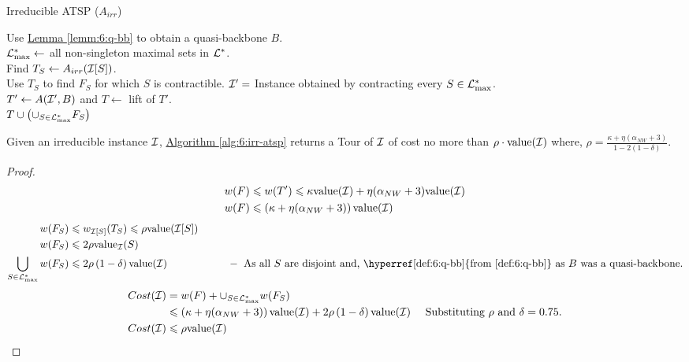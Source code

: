 \documentclass[./main.tex]{subfiles}
\begin{document}
	\begin{algorithm}\label{alg:6:irr-atsp}
		\caption{Irreducible ATSP ($A_{irr}$)}
		Use \hyperref[lemm:6:q-bb]{Lemma \ref{lemm:6:q-bb}} to obtain a quasi-backbone $B$.\\
		$\mathcal{L}^*_{\max} \leftarrow $ all non-singleton maximal sets in $\mathcal{L}^*$.\\
		 {
			Find $T_S \leftarrow A_{irr}(\mathcal{I}[S])$.\\
			Use $T_S$ to find $F_S$ for which $S$ is contractible. 
		}
		$\mathcal{I}' = $ Instance obtained by contracting every $S \in \mathcal{L}^*_{\max}$.\\
		$T' \leftarrow A(\mathcal{I}', B)$ and $T \leftarrow $ lift of $T'$.\\
		\Return $T \cup \left(\cup_{S \in \mathcal{L}^*_{\max}} F_S\right)$
	\end{algorithm}
	
	\begin{theorem}
		Given an irreducible instance $\mathcal{I}$, \hyperref[alg:6:irr-atsp]{Algorithm \ref{alg:6:irr-atsp}} returns a Tour of $\mathcal{I}$ of cost no more than $\rho\cdot\textup{value}(\mathcal{I})$ where, $\rho = \frac{\kappa + \eta(\alpha_{NW} + 3)}{1 - 2(1 - \delta)}$.
	\end{theorem}
	\begin{proof}
		\begin{align*}
			w(F) &\leqslant w(T') \leqslant \kappa\textup{value}(\mathcal{I}) + \eta(\alpha_{NW} + 3)\textup{value}(\mathcal{I}) \\
			w(F) &\leqslant \left(\kappa + \eta(\alpha_{NW} + 3)\right)\textup{value}(\mathcal{I})
		\end{align*}
		\begin{align*}
			w(F_S) &\leqslant w_{\calI[S]}(T_S) \leqslant \rho \val(\calI[S])\\
			w(F_S)&\leqslant 2\rho\val_{\calI}(S)\\
			\bigcup_{S \in \lam^*_{\max}} w(F_S) &\leqslant 2\rho \left(1 - \delta\right) \val(\calI)  \hspace*{2cm} -  \text{ As all $S$ are disjoint and, \hyperref[def:6:q-bb]{from \ref{def:6:q-bb}} as $B$ was a quasi-backbone.}
		\end{align*}
		\begin{align*}
			Cost(\mathcal{I}) &= w(F) + \cup_{S \in \mathcal{L}^*_{\max}} w(F_S) &\\
			&\leqslant \left(\kappa + \eta(\alpha_{NW} + 3)\right)\textup{value}(\mathcal{I}) + 2\rho \left(1 - \delta\right) \textup{value}(\mathcal{I}) & \text{ Substituting $\rho$ and $\delta = 0.75$.}\\
			Cost(\mathcal{I}) &\leqslant \rho\textup{value}(\mathcal{I})
		\end{align*}
		
	\end{proof}
\end{document}
